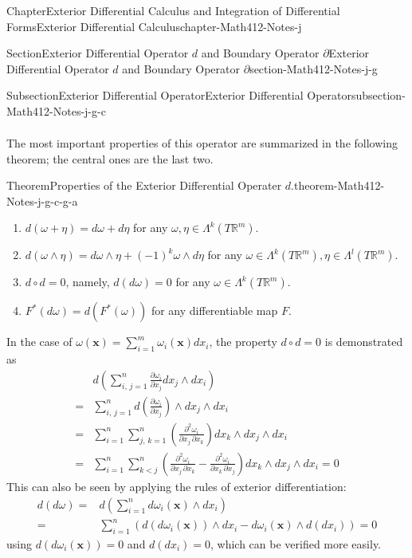\documentclass[oneside,10pt,]{book}
\numberwithin{equation}{section}
\newcommand{\bx}{\mathbf{x}}
\newcommand{\bbR}{\mathbb{R}}
\newcommand{\amp}{&}
\begin{document}
\begin{chapterptx}{Chapter}{Exterior Differential Calculus and Integration of Differential Forms}{}{Exterior Differential Calculus}{}{}{chapter-Math412-Notes-j}
\begin{sectionptx}{Section}{Exterior Differential Operator \(d\) and Boundary Operator \(\partial\)}{}{Exterior Differential Operator \(d\) and Boundary Operator \(\partial\)}{}{}{section-Math412-Notes-j-g}
\begin{subsectionptx}{Subsection}{Exterior Differential Operator}{}{Exterior Differential Operator}{}{}{subsection-Math412-Notes-j-g-c}
\begin{align*}
\end{align*}
%
\par
The most important properties of this operator are summarized in the following theorem; the central ones are the last two. \begin{theorem}{Theorem}{Properties of the Exterior Differential Operater \(d\).}{}{theorem-Math412-Notes-j-g-c-g-a}%
%
\begin{enumerate}
\item{}\(d (\omega + \eta) = d \omega + d \eta\)  for any  \(\omega, \eta \in \Lambda^{k}(T\bbR^{m})\).%
\item{}\(d(\omega\wedge \eta)=d\omega \wedge \eta + (-1)^{k} \omega \wedge d\eta\) for any \(\omega\in \Lambda^{k}(T\bbR^{m}),  \eta \in  \Lambda^{l}(T\bbR^{m}).\)%
\item{}\(d \circ d =0\), namely, \(d(d\omega)=0\) for any \(\omega \in \Lambda^{k}(T\bbR^{m})\).%
\item{}\(F^{*}(d\omega)=d(F^{*}(\omega))\) for any differentiable map \(F\).%
\end{enumerate}
\end{theorem}
%
\par
In the case of \(\omega(\bx)=\sum_{i=1}^{m}\omega_{i}(\bx)dx_{i}\), the property \(d \circ d =0\) is demonstrated as%
\begin{align*}
\amp d\left(\sum_{i,\, j =1}^{n}  
\frac{\partial \omega_{i}}{\partial x_j}  
dx_{j} \wedge dx_{i}\right) \\
=\amp \sum_{i,\,j =1}^{n} d \left( \frac{\partial \omega_{i}}{\partial x_j}  \right) \wedge dx_{j} \wedge dx_{i} \\
=\amp \sum_{i=1}^{n}\sum_{j,\,k=1}^{n}  \left( \frac{\partial^{2} \omega_{i}}{\partial x_j \,\partial x_{k}}  \right)dx_{k} \wedge dx_{j} \wedge dx_{i} \\
=\amp \sum_{i=1}^{n}\sum_{k < j}^{n}  \left( \frac{\partial^{2} \omega_{i}}{\partial x_j \,\partial x_{k}} -  \frac{\partial^{2} \omega_{i}}{\partial x_k \,\partial x_{j}} \right)dx_{k} \wedge dx_{j} \wedge dx_{i} =0
\end{align*}
This can also be seen by applying the rules of exterior differentiation:%
\begin{align*}
d(d\omega)=\amp d(\sum_{i=1}^{n} d\omega_{i}(\bx)\wedge dx_{i})\\
=\amp
\sum_{i=1}^{n} \left(d\left( d\omega_{i}(\bx) \right) \wedge dx_{i} -d \omega_{i}(\bx)\wedge d(dx_{i})\right)
=0
\end{align*}
using \(d\left( d\omega_{i}(\bx) \right)=0\) and \(d(dx_{i})=0\), which can be verified more easily.%

\end{subsectionptx}
\end{sectionptx}
\end{chapterptx}
\end{document}
